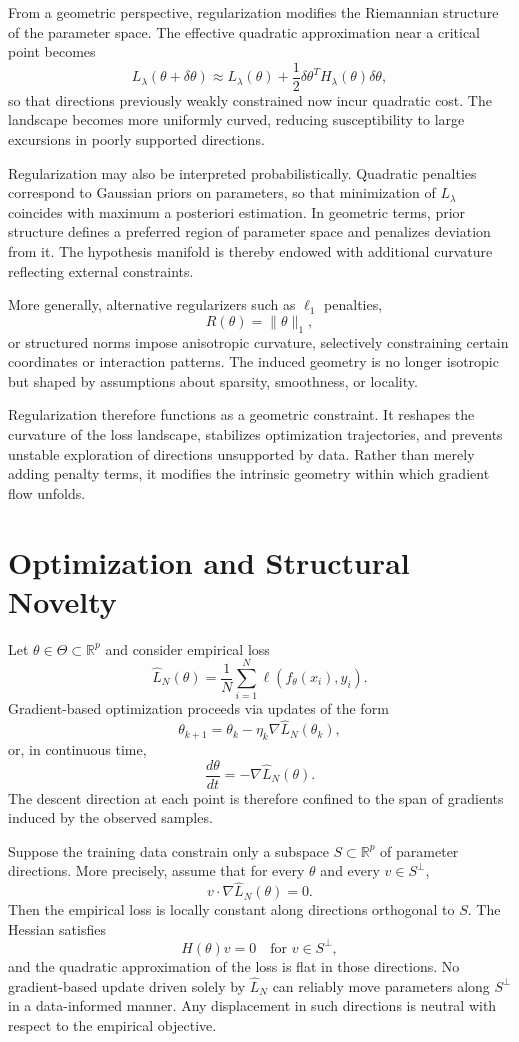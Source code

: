 \documentclass[12pt]{book}
\begin{document}
From a geometric perspective, regularization modifies the Riemannian structure of the parameter space. The effective quadratic approximation near a critical point becomes
\[
L_\lambda(\theta + \delta\theta)
\approx
L_\lambda(\theta)
+
\frac{1}{2}
\delta\theta^{T}
H_\lambda(\theta)
\delta\theta,
\]
so that directions previously weakly constrained now incur quadratic cost. The landscape becomes more uniformly curved, reducing susceptibility to large excursions in poorly supported directions.

Regularization may also be interpreted probabilistically. Quadratic penalties correspond to Gaussian priors on parameters, so that minimization of $L_\lambda$ coincides with maximum a posteriori estimation. In geometric terms, prior structure defines a preferred region of parameter space and penalizes deviation from it. The hypothesis manifold is thereby endowed with additional curvature reflecting external constraints.

More generally, alternative regularizers such as $\ell_1$ penalties,
\[
R(\theta)=\|\theta\|_1,
\]
or structured norms impose anisotropic curvature, selectively constraining certain coordinates or interaction patterns. The induced geometry is no longer isotropic but shaped by assumptions about sparsity, smoothness, or locality.

Regularization therefore functions as a geometric constraint. It reshapes the curvature of the loss landscape, stabilizes optimization trajectories, and prevents unstable exploration of directions unsupported by data. Rather than merely adding penalty terms, it modifies the intrinsic geometry within which gradient flow unfolds.

\section{Optimization and Structural Novelty}

Let $\theta \in \Theta \subset \mathbb{R}^p$ and consider empirical loss
\[
\hat{L}_N(\theta)
=
\frac{1}{N}
\sum_{i=1}^N
\ell(f_\theta(x_i), y_i).
\]
Gradient-based optimization proceeds via updates of the form
\[
\theta_{k+1}
=
\theta_k
-
\eta_k \nabla \hat{L}_N(\theta_k),
\]
or, in continuous time,
\[
\frac{d\theta}{dt}
=
-
\nabla \hat{L}_N(\theta).
\]
The descent direction at each point is therefore confined to the span of gradients induced by the observed samples.

Suppose the training data constrain only a subspace $S \subset \mathbb{R}^p$ of parameter directions. More precisely, assume that for every $\theta$ and every $v \in S^\perp$,
\[
v \cdot \nabla \hat{L}_N(\theta) = 0.
\]
Then the empirical loss is locally constant along directions orthogonal to $S$. The Hessian satisfies
\[
H(\theta) v = 0
\quad \text{for } v \in S^\perp,
\]
and the quadratic approximation of the loss is flat in those directions. No gradient-based update driven solely by $\hat{L}_N$ can reliably move parameters along $S^\perp$ in a data-informed manner. Any displacement in such directions is neutral with respect to the empirical objective.
\end{document}
